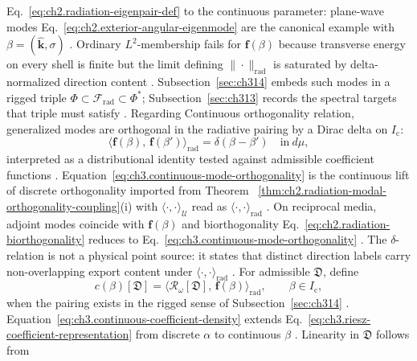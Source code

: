 Eq.~\eqref{eq:ch2.radiation-eigenpair-def} to the continuous parameter: plane-wave modes
Eq.~\eqref{eq:ch2.exterior-angular-eigenmode} are the canonical example with
\(\beta=(\hat{\mathbf{k}},\sigma)\) \cite{jackson1999}. Ordinary
\(L^{2}\)-membership fails for \(\mathbf{f}(\beta)\) because transverse energy on every shell is
finite but the limit defining \(\|\cdot\|_{\mathrm{rad}}\) is saturated by delta-normalized direction
content \cite{harrington2001}. Subsection~\ref{sec:ch314} embeds such modes in a rigged triple
\(\Phi\subset\mathcal{F}_{\mathrm{rad}}\subset\Phi^{*}\); Subsection~\ref{sec:ch313} records the
spectral targets that triple must satisfy \cite{stratton1941}.
Regarding Continuous orthogonality relation, generalized modes are orthogonal in the radiative pairing by a Dirac delta on \(I_{\mathrm{c}}\):
\begin{equation}
\label{eq:ch3.continuous-mode-orthogonality}
\big\langle \mathbf{f}(\beta),\,\mathbf{f}(\beta')\big\rangle_{\mathrm{rad}}
=
\delta(\beta-\beta')
\quad\text{in}\ d\mu,
\end{equation}
interpreted as a distributional identity tested against admissible coefficient functions
\cite{stratton1941}. Equation~\eqref{eq:ch3.continuous-mode-orthogonality} is the
continuous lift of discrete orthogonality imported from Theorem
~\ref{thm:ch2.radiation-modal-orthogonality-coupling}(i) with
\(\langle\cdot,\cdot\rangle_{\mathcal{U}}\) read as
\(\langle\cdot,\cdot\rangle_{\mathrm{rad}}\) \cite{stratton1941}. On reciprocal media, adjoint modes
coincide with \(\mathbf{f}(\beta)\) and biorthogonality Eq.~\eqref{eq:ch2.radiation-biorthogonality}
reduces to Eq.~\eqref{eq:ch3.continuous-mode-orthogonality} \cite{stratton1941}. The
\(\delta\)-relation is not a physical point source: it states that distinct direction labels carry
non-overlapping export content under \(\langle\cdot,\cdot\rangle_{\mathrm{rad}}\)
\cite{jackson1999}.
For admissible \(\mathfrak{D}\), define
\begin{equation}
\label{eq:ch3.continuous-coefficient-density}
c(\beta)[\mathfrak{D}]
=
\big\langle \mathcal{R}_\omega[\mathfrak{D}],\,\mathbf{f}(\beta)\big\rangle_{\mathrm{rad}},
\qquad
\beta\in I_{\mathrm{c}},
\end{equation}
when the pairing exists in the rigged sense of Subsection~\ref{sec:ch314}
\cite{stratton1941}. Equation~\eqref{eq:ch3.continuous-coefficient-density} extends
Eq.~\eqref{eq:ch3.riesz-coefficient-representation} from discrete \(\alpha\) to continuous
\(\beta\) \cite{stratton1941}. Linearity in \(\mathfrak{D}\) follows from
